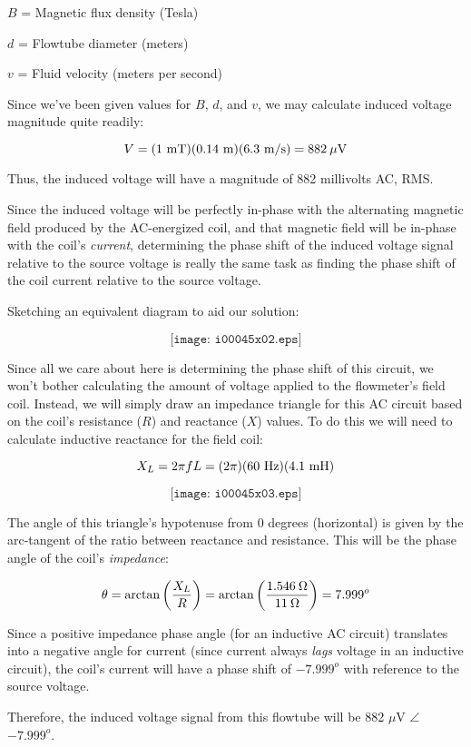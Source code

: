 $B$ = Magnetic flux density (Tesla)

$d$ = Flowtube diameter (meters)

$v$ = Fluid velocity (meters per second)

\vskip 10pt

Since we've been given values for $B$, $d$, and $v$, we may calculate induced voltage magnitude quite readily:

$$V = (1 \hbox{ mT}) (0.14 \hbox{ m}) (6.3 \hbox{ m/s}) = 882 \> \mu\hbox{V}$$

Thus, the induced voltage will have a magnitude of 882 millivolts AC, RMS.

\vskip 10pt

Since the induced voltage will be perfectly in-phase with the alternating magnetic field produced by the AC-energized coil, and that magnetic field will be in-phase with the coil's {\it current}, determining the phase shift of the induced voltage signal relative to the source voltage is really the same task as finding the phase shift of the coil current relative to the source voltage.

Sketching an equivalent diagram to aid our solution:

$$\texttt{[image: i00045x02.eps]}$$

Since all we care about here is determining the phase shift of this circuit, we won't bother calculating the amount of voltage applied to the flowmeter's field coil.  Instead, we will simply draw an impedance triangle for this AC circuit based on the coil's resistance ($R$) and reactance ($X$) values.  To do this we will need to calculate inductive reactance for the field coil:

$$X_L = 2 \pi f L = (2 \pi) (60 \hbox{ Hz}) (4.1 \hbox{ mH})$$

$$\texttt{[image: i00045x03.eps]}$$

The angle of this triangle's hypotenuse from 0 degrees (horizontal) is given by the arc-tangent of the ratio between reactance and resistance.  This will be the phase angle of the coil's {\it impedance}:

$$\theta = \arctan \left(X_L \over R \right) = \arctan \left(1.546 \> \Omega \over 11 \> \Omega \right) = 7.999^o$$

Since a positive impedance phase angle (for an inductive AC circuit) translates into a negative angle for current (since current always {\it lags} voltage in an inductive circuit), the coil's current will have a phase shift of $-7.999^o$ with reference to the source voltage.

\vskip 10pt

Therefore, the induced voltage signal from this flowtube will be 882 $\mu$V $\angle$ $-7.999^o$.




